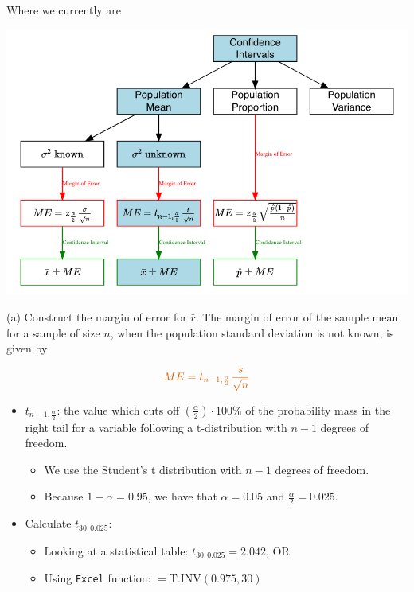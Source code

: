 \documentclass[
  11pt,
  ignorenonframetext,
]{beamer}
\providecommand{\tightlist}{%
  \setlength{\itemsep}{0pt}\setlength{\parskip}{0pt}}
\begin{document}
\begin{frame}{Where we currently are}
\protect\hypertarget{where-we-currently-are-1}{}
\begin{center}\includegraphics[width=0.9\linewidth]{pictures/CI_BriefReview-Ex2} \end{center}
\end{frame}

\begin{frame}[fragile]{(a) Construct the margin of error for
\(\bar{r}\).}
\protect\hypertarget{a-construct-the-margin-of-error-for-barr.}{}
The margin of error of the sample mean for a sample of size \(n\), when
the population standard deviation is not known, is given by

\[
\color{red}{ME = t_{n-1, \frac{\alpha}{2}} \frac{s}{\sqrt{n}}}
\]

\begin{itemize}
\tightlist
\item
  \(t_{n-1, \frac{\alpha}{2}}\): the value which cuts off
  \((\frac{\alpha}{2})\cdot 100\%\) of the probability mass in the right
  tail for a variable following a t-distribution with \(n-1\) degrees of
  freedom.

  \begin{itemize}
  \tightlist
  \item
    We use the Student's t distribution with \(n-1\) degrees of freedom.
  \item
    Because \(1-\alpha=0.95\), we have that \(\alpha=0.05\) and
    \(\frac{\alpha}{2}=0.025\).
  \end{itemize}
\item
  Calculate \(t_{30, 0.025}\):

  \begin{itemize}
  \tightlist
  \item
    Looking at a statistical table: \(t_{30, 0.025} = 2.042\), OR
  \item
    Using \texttt{Excel} function: \(=\text{T.INV}(0.975,30)\)
  \end{itemize}
\end{itemize}
\end{frame}
\end{document}
